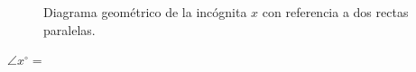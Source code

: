 \documentclass[11pt,addpoints]{exam}
\begin{document}
\begin{questions}
\begin{minipage}[b]{0.42\textwidth}
\begin{figure}[H]
            \caption{Diagrama geométrico de la inc\'ognita $x$ con referencia a dos rectas paralelas.}
            \label{fig:triangle_angle_04}
        \end{figure}
        \begin{center}
            {\color{purplePoint}\textbf{$\angle x^\circ =$}} \fbox{
                \begin{minipage}{2cm}
                    \hfill\vspace{0.5cm}
                \end{minipage}
            }
        \end{center}

    \end{minipage}


\end{questions}
\end{document}
